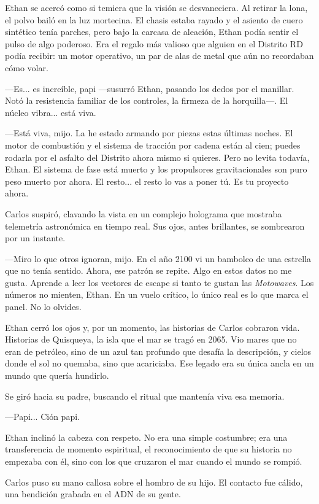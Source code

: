 \documentclass[12pt,a4paper]{book}
\begin{document}
Ethan se acercó como si temiera que la visión se desvaneciera. Al retirar la lona, el polvo bailó en la luz mortecina. El chasis estaba rayado y el asiento de cuero sintético tenía parches, pero bajo la carcasa de aleación, Ethan podía sentir el pulso de algo poderoso. Era el regalo más valioso que alguien en el Distrito RD podía recibir: un motor operativo, un par de alas de metal que aún no recordaban cómo volar.

---Es... es increíble, papi ---susurró Ethan, pasando los dedos por el manillar. Notó la resistencia familiar de los controles, la firmeza de la horquilla---. El núcleo vibra... está viva.

---Está viva, mijo. La he estado armando por piezas estas últimas noches. El motor de combustión y el sistema de tracción por cadena están al cien; puedes rodarla por el asfalto del Distrito ahora mismo si quieres. Pero no levita todavía, Ethan. El sistema de fase está muerto y los propulsores gravitacionales son puro peso muerto por ahora. El resto... el resto lo vas a poner tú. Es tu proyecto ahora.

Carlos suspiró, clavando la vista en un complejo holograma que mostraba telemetría astronómica en tiempo real. Sus ojos, antes brillantes, se sombrearon por un instante.

---Miro lo que otros ignoran, mijo. En el año 2100 vi un bamboleo de una estrella que no tenía sentido. Ahora, ese patrón se repite. Algo en estos datos no me gusta. Aprende a leer los vectores de escape si tanto te gustan las \textit{Motowaves}. Los números no mienten, Ethan. En un vuelo crítico, lo único real es lo que marca el panel. No lo olvides.

Ethan cerró los ojos y, por un momento, las historias de Carlos cobraron vida. Historias de Quisqueya, la isla que el mar se tragó en 2065. Vio mares que no eran de petróleo, sino de un azul tan profundo que desafía la descripción, y cielos donde el sol no quemaba, sino que acariciaba. Ese legado era su única ancla en un mundo que quería hundirlo.

Se giró hacia su padre, buscando el ritual que mantenía viva esa memoria.

---Papi... Ción papi.

Ethan inclinó la cabeza con respeto. No era una simple costumbre; era una transferencia de momento espiritual, el reconocimiento de que su historia no empezaba con él, sino con los que cruzaron el mar cuando el mundo se rompió.

Carlos puso su mano callosa sobre el hombro de su hijo. El contacto fue cálido, una bendición grabada en el ADN de su gente.
\end{document}
